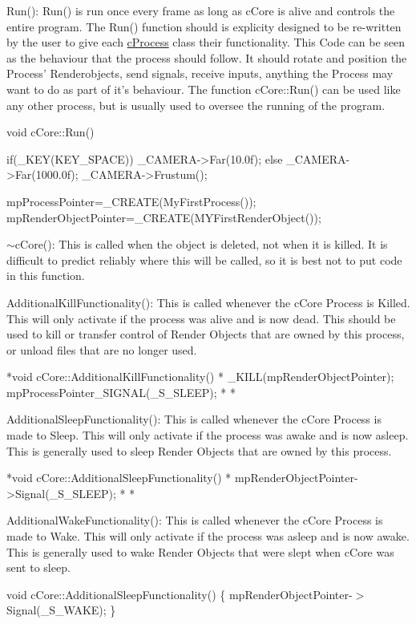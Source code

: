 Run(): Run() is run once every frame as long as cCore is alive and controls the entire program. The Run() function should is explicity designed to be re-\/written by the user to give each \hyperlink{classc_process}{cProcess} class their functionality. This Code can be seen as the behaviour that the process should follow. It should rotate and position the Process' Renderobjects, send signals, receive inputs, anything the Process may want to do as part of it's behaviour. The function cCore::Run() can be used like any other process, but is usually used to oversee the running of the program. 
\begin{DoxyCode}
 void cCore::Run()
 {

  if(_KEY(KEY_SPACE)) _CAMERA->Far(10.0f);
   else _CAMERA->Far(1000.0f);
  _CAMERA->Frustum();

  mpProcessPointer=_CREATE(MyFirstProcess());
  mpRenderObjectPointer=_CREATE(MYFirstRenderObject());

 }
\end{DoxyCode}


$\sim$cCore(): This is called when the object is deleted, not when it is killed. It is difficult to predict reliably where this will be called, so it is best not to put code in this function.

AdditionalKillFunctionality(): This is called whenever the cCore Process is Killed. This will only activate if the process was alive and is now dead. This should be used to kill or transfer control of Render Objects that are owned by this process, or unload files that are no longer used.


\begin{DoxyCode}
 *void cCore::AdditionalKillFunctionality()
 *{
 _KILL(mpRenderObjectPointer);
 mpProcessPointer_SIGNAL(_S_SLEEP);
         *}
         *
\end{DoxyCode}


AdditionalSleepFunctionality(): This is called whenever the cCore Process is made to Sleep. This will only activate if the process was awake and is now asleep. This is generally used to sleep Render Objects that are owned by this process.


\begin{DoxyCode}
         *void cCore::AdditionalSleepFunctionality()
         *{
 mpRenderObjectPointer->Signal(_S_SLEEP);
                 *}
                 *
\end{DoxyCode}


AdditionalWakeFunctionality(): This is called whenever the cCore Process is made to Wake. This will only activate if the process was asleep and is now awake. This is generally used to wake Render Objects that were slept when cCore was sent to sleep.

void cCore::AdditionalSleepFunctionality() \{ mpRenderObjectPointer-\/$>$Signal(\_\-S\_\-WAKE); \}  